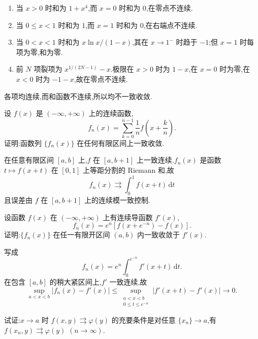 \begin{solution}
    \begin{enumerate}
        \item 当 $x>0$ 时和为 $1+x^4$,而 $x=0$ 时和为 $0$,在零点不连续.
        \item 当 $0\leq x<1$ 时和为 $1$,而 $x=1$ 时和为 $0$,在右端点不连续.
        \item 当 $0<x<1$ 时和为 $x\ln x/(1-x)$,其在 $x\to1^-$ 时趋于 $-1$;但 $x=1$ 时每项为零,和为零.
        \item 前 $N$ 项裂项为 $x^{1/(2N-1)}-x$.极限在 $x>0$ 时为 $1-x$,在 $x=0$ 时为零,在 $x<0$ 时为 $-1-x$,故在零点不连续.
    \end{enumerate}
    各项均连续,而和函数不连续,所以均不一致收敛.
\end{solution}

\begin{example}
    设 $f(x)$ 是 $(-\infty,+\infty)$ 上的连续函数,
    \[
        f_n(x)=\sum\limits_{k=0}^{n-1}\dfrac{1}{n}f\left(x+\dfrac{k}{n}\right).
    \]
    证明:函数列 $\{f_n(x)\}$ 在任何有限区间上一致收敛.
\end{example}
\exampleblank

\begin{solution}
    在任意有限区间 $[a,b]$ 上,$f$ 在 $[a,b+1]$ 上一致连续.$f_n(x)$ 是函数
    $t\mapsto f(x+t)$ 在 $[0,1]$ 上等距分割的 Riemann 和,故
    \[
        f_n(x)\rightrightarrows\int_0^1f(x+t)\,\mathrm{d}t
    \]
    且误差由 $f$ 在 $[a,b+1]$ 上的连续模一致控制.
\end{solution}

\begin{example}
    设函数 $f(x)$ 在 $(-\infty,+\infty)$ 上有连续导函数 $f'(x)$,
    \[
        f_n(x)=e^n\left[f(x+e^{-n})-f(x)\right].
    \]
    证明:$\{f_n(x)\}$ 在任一有限开区间 $(a,b)$ 内一致收敛于 $f'(x)$.
\end{example}
\exampleblank

\begin{solution}
    写成
    \[
        f_n(x)=e^n\int_0^{e^{-n}}f'(x+t)\,\mathrm{d}t.
    \]
    在包含 $[a,b]$ 的稍大紧区间上,$f'$ 一致连续,故
    \[
        \sup_{a<x<b}|f_n(x)-f'(x)|
        \leq\sup_{\substack{a<x<b\\0\leq t\leq e^{-n}}}|f'(x+t)-f'(x)|\longrightarrow0.
    \]
\end{solution}

\begin{example}
    试证:$x\to a$ 时 $f(x,y)\rightrightarrows\varphi(y)$ 的充要条件是对任意 $\{x_n\}\to a$,有 $f(x_n,y)\rightrightarrows\varphi(y)$ $(n\to\infty)$.
\end{example}
\exampleblank

